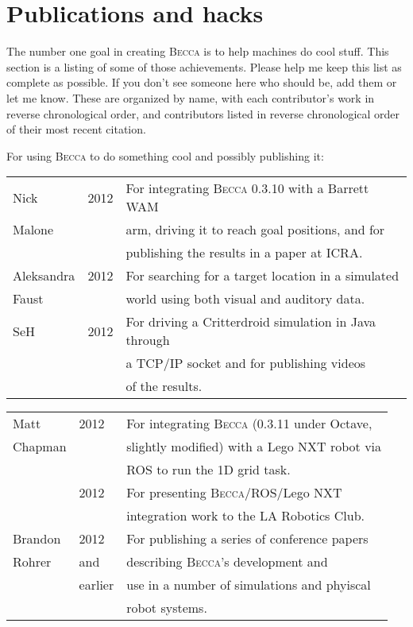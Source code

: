 \chapter{Publications and hacks}

The number one goal in creating \textsc{Becca} is to help machines do cool stuff. This section is a listing of some of those achievements. Please help me keep this list as complete as possible. If you don't see someone here who should be, add them or let me know. These are organized by name, with each contributor's work in reverse chronological order, and contributors listed in reverse chronological order of their most recent citation.

For using \textsc{Becca} to do something cool and possibly publishing it:

\begin{tabular}{|l|l|l|}
\hline
Nick &2012& For integrating \textsc{Becca} 0.3.10 with a Barrett WAM\\
Malone&& arm, driving it to reach goal positions, and for \\
 && publishing the results in a paper at ICRA.\\
\hline
Aleksandra & 2012 & For searching for a target location in a simulated\\
Faust&& world using both visual and auditory data.\\
\hline
SeH & 2012 & For driving a Critterdroid simulation in Java through \\
&&a TCP/IP socket and for publishing videos \\
&&of the results. \\
\hline
 \end{tabular}

\begin{tabular}{|l|l|l|}
\hline
Matt & 2012 & For integrating \textsc{Becca} (0.3.11 under Octave,\\
Chapman&& slightly modified) with a Lego NXT robot via \\
&&ROS to run the 1D grid task.\\
& 2012 & For presenting \textsc{Becca}/ROS/Lego NXT \\
&&integration work to the LA Robotics Club.\\
\hline
Brandon & 2012 & For publishing a series of conference papers  \\
Rohrer & and & describing \textsc{Becca}'s development and \\
& earlier & use in a number of simulations and phyiscal \\
&& robot systems.\\
\hline
\end{tabular}


